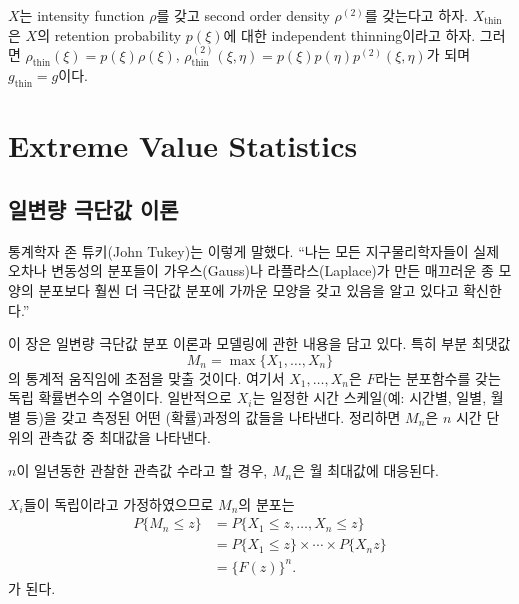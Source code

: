 \documentclass[b5paper,]{scrbook}
\theoremstyle{plain}
\theoremstyle{definition}
\numberwithin{equation}{section}
\let\BeginKnitrBlock\begin \let\EndKnitrBlock\end
\begin{document}
\BeginKnitrBlock{proposition}
\protect\hypertarget{prp:unnamed-chunk-420}{}{\label{prp:unnamed-chunk-420} } \(X\)는 intensity function \(\rho\)를 갖고 second order density \(\rho^{(2)}\)를 갖는다고 하자. \(X_{\text{thin}}\)은 \(X\)의 retention probability \(p(\xi)\)에 대한 independent thinning이라고 하자. 그러면 \(\rho_{\text{thin}}(\xi)=p(\xi)\rho(\xi)\), \(\rho_{\text{thin}}^{(2)}(\xi,\eta)=p(\xi)p(\eta)p^{(2)}(\xi,\eta)\)가 되며 \(g_{\text{thin}}=g\)이다.
\EndKnitrBlock{proposition}

\hypertarget{part-extreme-value-statistics}{%
\part{Extreme Value Statistics}\label{part-extreme-value-statistics}}

\hypertarget{uGEVtheory}{%
\chapter{일변량 극단값 이론}\label{uGEVtheory}}

통계학자 존 튜키(John Tukey)는 이렇게 말했다. ``나는 모든 지구물리학자들이 실제 오차나 변동성의 분포들이 가우스(Gauss)나 라플라스(Laplace)가 만든 매끄러운 종 모양의 분포보다 훨씬 더 극단값 분포에 가까운 모양을 갖고 있음을 알고 있다고 확신한다.''

이 장은 일변량 극단값 분포 이론과 모델링에 관한 내용을 담고 있다. 특히 부분 최댓값
\[M_{n}=\max\{X_{1},\ldots,X_{n}\}\]
의 통계적 움직임에 초점을 맞출 것이다. 여기서 \(X_{1},\ldots,X_{n}\)은 \(F\)라는 분포함수를 갖는 독립 확률변수의 수열이다. 일반적으로 \(X_{i}\)는 일정한 시간 스케일(예: 시간별, 일별, 월별 등)을 갖고 측정된 어떤 (확률)과정의 값들을 나타낸다. 정리하면 \(M_{n}\)은 \(n\) 시간 단위의 관측값 중 최대값을 나타낸다.

\BeginKnitrBlock{definition}[극단값의 예]
\protect\hypertarget{def:unnamed-chunk-421}{}{\label{def:unnamed-chunk-421} {} }\(n\)이 일년동한 관찰한 관측값 수라고 할 경우, \(M_{n}\)은 월 최대값에 대응된다.
\EndKnitrBlock{definition}

\(X_{i}\)들이 독립이라고 가정하였으므로 \(M_{n}\)의 분포는
\[
\begin{align*}
P\{M_{n} \leq z \} &= P\{X_{1}\leq z, \ldots, X_{n} \leq z\}\\
&=P\{X_{1}\leq z\}\times \cdots \times P\{X_{n}z\}\\
&=\{F(z)\}^{n}.
\end{align*}
\]
가 된다.
\end{document}
